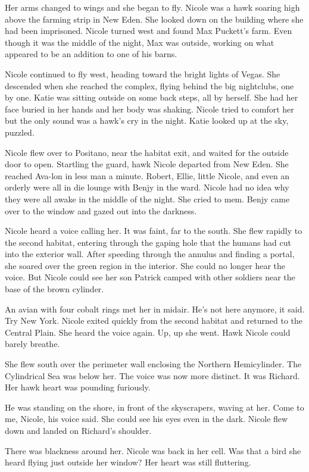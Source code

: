 \documentclass[]{article}
\begin{document}
{{Her arms changed to wings and she began to fly. Nicole was a hawk soaring high above the farming strip in New Eden. She looked down on the building where she had been imprisoned. Nicole turned west and found Max Puckett’s farm. Even though it was the middle of the night, Max was outside, working on what appeared to be an addition to one of his barns.

Nicole continued to fly west, heading toward the bright lights of Vegas. She descended when she reached the complex, flying behind the big nightclubs, one by one. Katie was sitting outside on some back steps, all by herself. She had her face buried in her hands and her body was shaking. Nicole tried to comfort her but the only sound was a hawk’s cry in the night. Katie looked up at the sky, puzzled.

Nicole flew over to Positano, near the habitat exit, and waited for the outside door to open. Startling the guard, hawk Nicole departed from New Eden. She reached Ava-lon in less man a minute. Robert, Ellie, little Nicole, and even an orderly were all in die lounge with Benjy in the ward. Nicole had no idea why they were all awake in the middle of the night. She cried to mem. Benjy came over to the window and gazed out into the darkness.

Nicole heard a voice calling her. It was faint, far to the south. She flew rapidly to the second habitat, entering through the gaping hole that the humans had cut into the exterior wall. After speeding through the annulus and finding a portal, she soared over the green region in the interior. She could no longer hear the voice. But Nicole could see her son Patrick camped with other soldiers near the base of the brown cylinder.

An avian with four cobalt rings met her in midair. He’s not here anymore, it said. Try New York. Nicole exited quickly from the second habitat and returned to the Central Plain. She heard the voice again. Up, up she went. Hawk Nicole could barely breathe.

She flew south over the perimeter wall enclosing the Northern Hemicylinder. The Cylindrical Sea was below her. The voice was now more distinct. It was Richard. Her hawk heart was pounding furiously.

He was standing on the shore, in front of the skyscrapers, waving at her. Come to me, Nicole, his voice said. She could see his eyes even in the dark. Nicole flew down and landed on Richard’s shoulder.

There was blackness around her. Nicole was back in her cell. Was that a bird she heard flying just outside her window? Her heart was still fluttering.

}}
\end{document}
